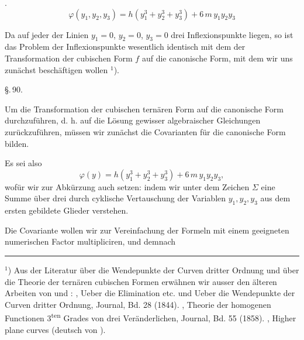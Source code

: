 
.\ 
\[
\varphi(y_1,y_2,y_3) = h(y_1^3+y_2^3+y_3^3) + 6\,m\,y_1y_2y_3
\]

Da auf jeder der Linien $y_1=0$, $y_2=0$, $y_3=0$ drei Inflexionspunkte liegen, so ist das Problem der Inflexionspunkte wesentlich identisch mit dem der Transformation der cubischen Form $f$ auf die canonische Form, mit dem wir uns zunächst beschäftigen wollen $^1$).

\begin{center}
\S.\,90.

\end{center}

Um die Transformation der cubischen ternären Form auf die canonische Form durchzuführen, d. h. auf die Lösung gewisser algebraischer Gleichungen zurückzuführen, müssen wir zunächst die Covarianten für die canonische Form bilden.

Es sei also
\[
\varphi(y) = h(y_1^3+y_2^3+y_3^3) + 6\,m\,y_1y_2y_3,
\]
wofür wir zur Abkürzung auch setzen:
indem wir unter dem Zeichen $\Sigma$ eine Summe über drei durch cyklische Vertauschung der Variablen $y_1,y_2,y_3$ aus dem ersten gebildete Glieder verstehen.

Die  Covariante wollen wir zur Vereinfachung der Formeln mit einem geeigneten numerischen Factor multipliciren, und demnach

\medskip
\noindent\rule{4cm}{0.4pt}

\smallskip
\noindent $^1$) Aus der Literatur über die Wendepunkte der Curven dritter Ordnung und über die Theorie der ternären cubischen Formen erwähnen wir ausser den älteren Arbeiten von  und : , \glqq Ueber die Elimination etc.\grqq{} und \glqq Ueber die Wendepunkte der Curven dritter Ordnung\grqq{},  Journal, Bd. 28 (1844). , Theorie der homogenen Functionen 3\textsuperscript{ten} Grades von drei Veränderlichen,  Journal, Bd. 55 (1858). , Higher plane curves (deutsch von ).
